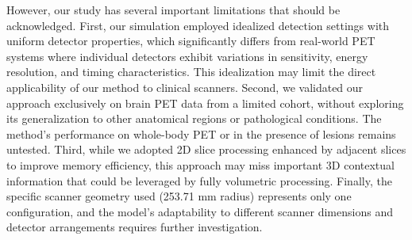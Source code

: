 \documentclass[aps,prb,preprint,groupedaddress,showkeys]{revtex4}
\begin{document}
However, our study has several important limitations that should be acknowledged. First, our simulation employed idealized detection settings with uniform detector properties, which significantly differs from real-world PET systems where individual detectors exhibit variations in sensitivity, energy resolution, and timing characteristics. This idealization may limit the direct applicability of our method to clinical scanners. Second, we validated our approach exclusively on brain PET data from a limited cohort, without exploring its generalization to other anatomical regions or pathological conditions. The method's performance on whole-body PET or in the presence of lesions remains untested. Third, while we adopted 2D slice processing enhanced by adjacent slices to improve memory efficiency, this approach may miss important 3D contextual information that could be leveraged by fully volumetric processing. 
Finally, the specific scanner geometry used (253.71 mm radius) represents only one configuration, and the model's adaptability to different scanner dimensions and detector arrangements requires further investigation.



\end{document}
